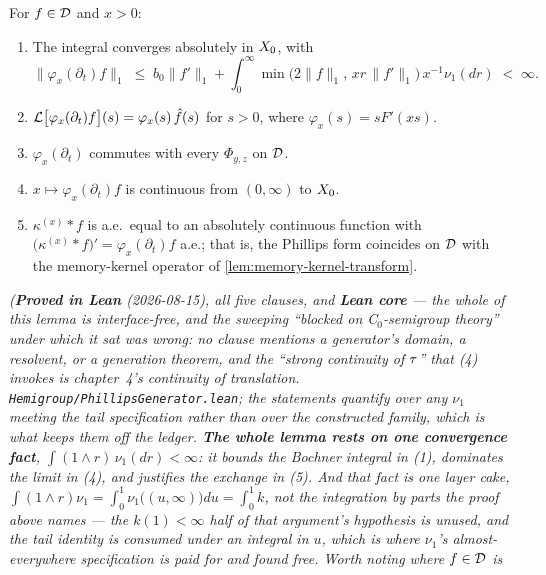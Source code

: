 \begin{lemma}\label{lem:generator-properties}
\leanok
For $f \in \mathcal{D}$ and $x > 0$:
\begin{enumerate}
\item The integral converges absolutely in $X_0$, with
\[
  \|\varphi_x(\partial_t) f\|_1 \;\le\; b_0 \|f'\|_1
  + \int_0^\infty \min\bigl(2\|f\|_1,\, xr\,\|f'\|_1\bigr)\,x^{-1}\nu_1(dr) \;<\; \infty.
\]
\item $\mathcal{L}\bigl[\varphi_x(\partial_t) f\bigr](s) = \varphi_x(s)\,\hat f(s)$ for $s > 0$, where
$\varphi_x(s) = s F'(xs)$.
\item $\varphi_x(\partial_t)$ commutes with every $\Phi_{y,z}$ on $\mathcal{D}$.
\item $x \mapsto \varphi_x(\partial_t) f$ is continuous from $(0,\infty)$ to $X_0$.
\item $\kappa^{(x)} * f$ is a.e.\ equal to an absolutely continuous function with
$\bigl(\kappa^{(x)} * f\bigr)' = \varphi_x(\partial_t) f$ a.e.; that is, the Phillips form
coincides on $\mathcal{D}$ with the memory-kernel operator of \ref{lem:memory-kernel-transform}.
\end{enumerate}
\statusT\quad\emph{(\textbf{Proved in Lean} (2026-08-15), all five clauses, and \textbf{Lean
core} --- the whole of this lemma is interface-free, and the sweeping ``blocked on
C$_0$-semigroup theory'' under which it sat was wrong: no clause mentions a generator's domain, a
resolvent, or a generation theorem, and the ``strong continuity of $\tau$'' that (4) invokes is
chapter~4's continuity of translation. \texttt{Hemigroup/PhillipsGenerator.lean}; the statements
quantify over any $\nu_1$ meeting the tail specification rather than over the constructed family,
which is what keeps them off the ledger.
\textbf{The whole lemma rests on one convergence fact}, $\int(1 \wedge r)\,\nu_1(dr) < \infty$: it
bounds the Bochner integral in (1), dominates the limit in (4), and justifies the exchange in (5).
And that fact is \emph{one layer cake},
$\int(1\wedge r)\nu_1 = \int_0^1 \nu_1\bigl((u,\infty)\bigr)du = \int_0^1 k$, not the integration
by parts the proof above names --- the $k(1) < \infty$ half of that argument's hypothesis is
unused, and the tail identity is consumed under an integral in $u$, which is where $\nu_1$'s
almost-everywhere specification is paid for and found free. Worth noting where $f \in \mathcal{D}$ is
}
\end{lemma}

